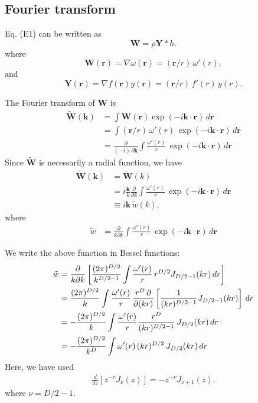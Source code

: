 \documentclass[preprint]{revtex4-1}
\numberwithin{equation}{subsection}
\numberwithin{table}{section}
\newcommand{\vct}[1]{\mathbf{#1}}
\providecommand{\vr}{} %
\renewcommand{\vr}{\vct{r}}
\newcommand{\vk}{\vct{k}}
\begin{document}
\subsection{Fourier transform}

Eq. (E1) can be written as
\[
  \vct{W}
=
\rho \vct{Y} * h.
\]
where
\[
  \vct{W}(\vr) = \nabla \omega(\vr) = (\vr/r) \, \omega'(r),
\]
and
\[
  \vct{Y}(\vr) = \nabla f(\vr) y(\vr)
  = (\vr/r) \, f'(r) \, y(r).
\]

The Fourier transform of $\vct W$ is
\begin{align*}
  \tilde{\vct{W}}(\vk)
&=
\int \vct{W}(\vr) \exp(-i\vk\cdot\vr) \, d\vr
\\
&=
\int (\vr/r) \, \omega'(r) \, \exp(-i\vk\cdot\vr) \, d\vr
\\
&=
\frac{\partial}{(-i) \, \partial \vk}
\int \frac{\omega'(r)}{r} \, \exp(-i\vk\cdot\vr) \, d\vr
\end{align*}
%
Since $\tilde{\vct{W}}$ is necessarily a radial function,
we have
\begin{align*}
  \tilde{\vct{W}}(\vk)
&=
  \tilde{\vct{W}}(k)
\\
&=
i \frac{\vk}{k} \frac{\partial}{\partial k}
\int \frac{\omega'(r)}{r} \, \exp(-i\vk\cdot\vr) \, d\vr
\\
&\equiv
i \vk \, \tilde{w}(k),
\end{align*}
where
\begin{align*}
\tilde{w}
&=
\frac{\partial}{k\partial k}
\int \frac{\omega'(r)}{r} \, \exp(-i\vk\cdot\vr) \, d\vr
\end{align*}

We write the above function in Bessel functions:
\begin{align}
  \tilde{w}
&=
\frac{\partial}{k\partial k}
\left[
\frac{(2\pi)^{D/2}}{k^{D/2-1}}
\int \frac{\omega'(r)}{r} \, r^{D/2} J_{D/2-1}(kr) \, dr
\right]
\notag \\
&=
\frac{(2\pi)^{D/2}}{k}
\int
\frac{\omega'(r)}{r}
\,
\frac{r^D \, \partial}{\partial (kr)}
\left[
\frac{1}{(kr)^{D/2-1}}
  J_{D/2-1}(kr)
\right]
\, dr
\notag \\
&=
-
\frac{(2\pi)^{D/2}}{k}
\int
\frac{\omega'(r)}{r}
\frac{r^D}
{
(kr)^{D/2-1}
}
\, J_{D/2}(kr) \, dr
\notag \\
&=
-
\frac{(2\pi)^{D/2}}{k^D}
\int
\omega'(r) \, (kr)^{D/2}
\, J_{D/2}(kr) \, dr
\label{eq:wbessel1}
\end{align}
Here, we have used
\begin{align*}
  \frac{d}{dz} [z^{-\nu} J_\nu(z)] = -z^{-\nu} J_{\nu+1}(z).
\end{align*}
where $\nu = D/2-1$.
\end{document}
